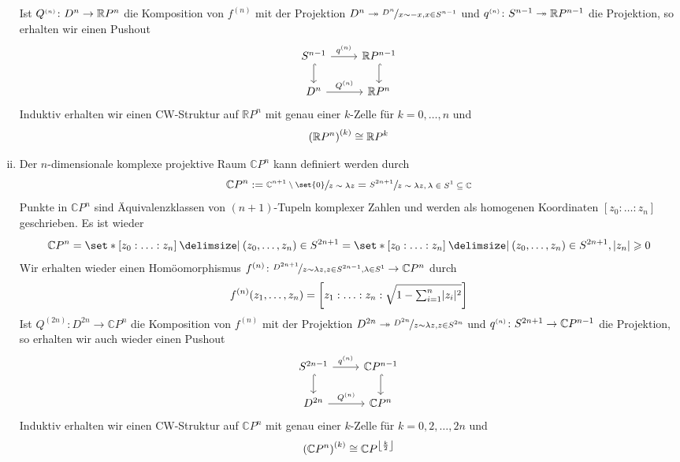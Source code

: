 \begin{beispiel}[label=bsp:115]
\begin{enumerate}[(i)]
\[		\]
		Ist $Q^\ssbrace{n} \colon D^n \to \mathbb{R}P^n$ die Komposition von $f^{(n)}$ mit der Projektion $D^n \twoheadrightarrow \nicefrac{D^n}{x \sim -x, x \in S^{n-1}}$ und 
		$q^\ssbrace{n} \colon S^{n-1} \twoheadrightarrow \mathbb{R}P^{n-1}$ die Projektion, so erhalten wir einen Pushout
		\[
			\begin{tikzcd}
				S^{n-1} \rar["q^\ssbrace{n}"] \dar[hook]& \mathbb{R}P^{n-1} \dar[hook] \\
				D^n \rar["Q^\ssbrace{n}"] & \mathbb{R}P^n
			\end{tikzcd}
		\]
		Induktiv erhalten wir einen CW-Struktur auf $\mathbb{R}P^n$ mit genau einer $k$-Zelle für $k=0,\ldots ,n$ und 
		\[
			\enbrace*{\mathbb{R}P^n}^{(k)} \cong \mathbb{R}P^k 
		\]
		\item \label{enum:115:5} Der $n$-dimensionale komplexe projektive Raum $\mathbb{C}P^n$ kann definiert werden durch 
		\[
			\mathbb{C}P^n := \sfrac{\mathbb{C}^{n+1} \setminus \set{0}}{z \sim \lambda z} = \sfrac{S^{2n+1}}{z \sim \lambda z, \lambda \in S^1 \subseteq \mathbb{C}}
		\]
		Punkte in $\mathbb{C}P^n$ sind Äquivalenzklassen von $(n+1)$-Tupeln komplexer Zahlen und werden als homogenen Koordinaten $[z_0 : \ldots : z_n]$ 
		geschrieben. Es ist wieder
		\[
			\mathbb{C}P^n = \set*{[z_0 : \ldots : z_n] \given (z_0, \ldots ,z_n) \in S^{2n+1} \rule{0cm}{1em}} 
			= \set*{[z_0 : \ldots : z_n] \given (z_0, \ldots ,z_n) \in S^{2n+1}, \abs{z_n} \ge 0 \rule{0cm}{1em}}
		\]
		Wir erhalten wieder einen Homöomorphismus $f^{(n)} \colon \nicefrac{D^{2n+1}}{z \sim \lambda z, z \in S^{2n-1},\lambda \in S^{1}} \to \mathbb{C}P^n$ durch
		\[
			f^{(n)} \enbrace*{z_1, \ldots ,z_n} = \benbrace*{z_1 : \ldots : z_n : \sqrt{1- {\textstyle\sum\nolimits_{i=1}^{n}} \abs{z_i}^2}} 
		\]
		Ist $Q^{(2n)} \colon D^{2n} \to \mathbb{C}P^n$ die Komposition von $f^{(n)}$ mit der Projektion $D^{2n} \twoheadrightarrow \nicefrac{D^{2n}}{z \sim \lambda z, z \in S^{2n}}$ und 
		$q^\ssbrace{n} \colon S^{2n+1} \to \mathbb{C}P^{n-1}$ die Projektion, so erhalten wir auch wieder einen Pushout
		\[
			\begin{tikzcd}
				S^{2n-1} \rar["q^\ssbrace{n}"] \dar[hook]& \mathbb{C}P^{n-1} \dar[hook] \\
				D^{2n} \rar["Q^\ssbrace{n}"] & \mathbb{C}P^n
			\end{tikzcd}
		\]
		Induktiv erhalten wir einen CW-Struktur auf $\mathbb{C}P^n$ mit genau einer $k$-Zelle für $k=0,2,\ldots ,2n$ und 
		\[
			\enbrace*{\mathbb{C}P^n}^{(k)} \cong \mathbb{C}P^{\floor*{\frac{k}{2}}} 
		\]
	\end{enumerate}
\end{beispiel}

